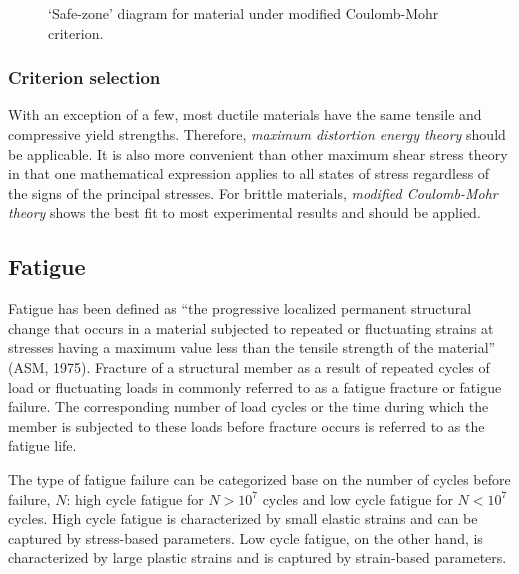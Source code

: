 \documentclass[a4paper,openany,nobib]{tufte-book}
\begin{document}
\begin{figure}[h]
  \centering
  \caption{`Safe-zone' diagram for material under modified Coulomb-Mohr criterion.}
  \label{fig: MCM safe zone}
\end{figure}

\subsubsection{Criterion selection}
\label{criterion-selection}
With an exception of a few, most ductile materials have the same tensile
and compressive yield strengths. Therefore, \emph{maximum distortion energy
theory} should be applicable. It is also more convenient than other
maximum shear stress theory in that one mathematical expression applies
to all states of stress regardless of the signs of the principal
stresses. For brittle materials, \emph{modified Coulomb-Mohr theory} shows
the best fit to most experimental results and should be applied.

\subsection{Fatigue}
\label{fatigue}
Fatigue has been defined as ``the progressive localized permanent
structural change that occurs in a material subjected to repeated or
fluctuating strains at stresses having a maximum value less than the
tensile strength of the material'' (ASM, 1975). Fracture of a structural
member as a result of repeated cycles of load or fluctuating loads in
commonly referred to as a fatigue fracture or fatigue failure. The
corresponding number of load cycles or the time during which the member
is subjected to these loads before fracture occurs is referred to as the
fatigue life.

The type of fatigue failure can be categorized base on the number of
cycles before failure, \(N\): high cycle fatigue for \(N > 10^7\) cycles and
low cycle fatigue for \(N < 10^7\) cycles. High cycle fatigue is
characterized by small elastic strains and can be captured by
stress-based parameters. Low cycle fatigue, on the other hand, is
characterized by large plastic strains and is captured by strain-based
parameters.
\end{document}
